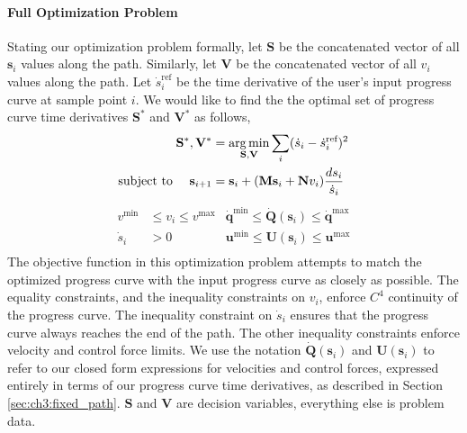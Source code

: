 \paragraph{Full Optimization Problem}
Stating our optimization problem formally, let $\mathbf{S}$ be the concatenated vector of all $\mathbf{s}_i$ values along the path.
Similarly, let $\mathbf{V}$ be the concatenated vector of all $v_i$ values along the path.
Let $\dot{s}_i^{\text{ref}}$ be the  time derivative of the user's input progress curve at sample point $i$.
We would like to find the the optimal set of progress curve time derivatives $\mathbf{S}^*$ and $\mathbf{V}^*$ as follows, 
%
\begin{equation*}
\begin{aligned}
\mathbf{S}^{*},\mathbf{V}^{*} & = \operatorname*{arg\,min}_{\mathbf{S},\mathbf{V}} \sum_{i} ( \dot{s}_i - \dot{s}_i^{\text{ref}} )^{2} \\
\text{subject to~~~~}
\mathbf{s}_{i+1}              & =    \mathbf{s}_{i} + (\mathbf{M}\mathbf{s}_{i} + \mathbf{N}v_{i}) \frac{ds_i}{\dot{s}_i} \\
\end{aligned}
\end{equation*}
%
\vspace{-5pt}
\begin{equation}
\begin{aligned}
v^{\text{min}}  & \leq v_i \leq v^{\text{max}} & \dot{\mathbf{q}}^{\text{min}}  \leq \dot{\mathbf{Q}}(\mathbf{s}_i) \leq \dot{\mathbf{q}}^{\text{max}} \\
\dot{s}_i       & > 0                          & \mathbf{u}^{\text{min}}          \leq \mathbf{U}(\mathbf{s}_i)       \leq \mathbf{u}^{\text{max}} \\
\end{aligned}
\label{eqn:ch3:s_star_v_star}
\end{equation}
%
The objective function in this optimization problem attempts to match the optimized progress curve with the input progress curve as closely as possible.
The equality constraints, and the inequality constraints on $v_i$, enforce $C^4$ continuity of the progress curve.
The inequality constraint on $\dot{s}_i$ ensures that the progress curve always reaches the end of the path.
The other inequality constraints enforce velocity and control force limits.
We use the notation $\dot{\mathbf{Q}}(\mathbf{s}_i)$ and $\mathbf{U}(\mathbf{s}_i)$ to refer to our closed form expressions for velocities and control forces, expressed entirely in terms of our progress curve time derivatives, as described in Section \ref{sec:ch3:fixed_path}.
$\mathbf{S}$ and $\mathbf{V}$ are decision variables, everything else is problem data.

